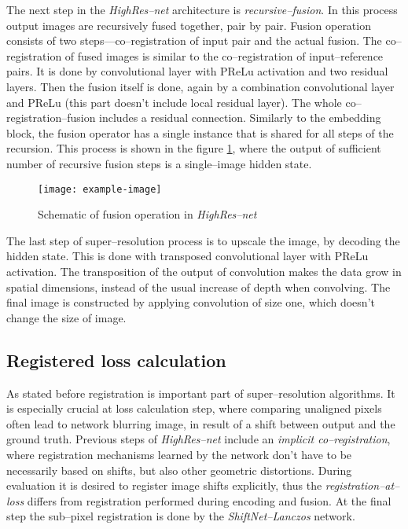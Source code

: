The next step in the \textit{HighRes--net} architecture is \textit{recursive--fusion}.
In this process output images are recursively fused together, pair by pair.
Fusion operation consists of two steps---co--registration of input pair and the actual fusion.
The co--registration of fused images is similar to the co--registration of input--reference pairs.
It is done by convolutional layer with PReLu activation and two residual layers.
Then the fusion itself is done, again by a combination convolutional layer and PReLu (this part doesn't include local residual layer).
The whole co--registration--fusion includes a residual connection.
Similarly to the embedding block, the fusion operator has a single instance that is shared for all steps of the recursion.
This process is shown in the figure \ref{fig:highresnet-fusion}, where the output of sufficient number of recursive fusion steps is a single--image hidden state.
\begin{figure}
    \centering
    \texttt{[image: example-image]}
    \caption{Schematic of fusion operation in \textit{HighRes--net}}
    \label{fig:highresnet-fusion}
\end{figure}

The last step of super--resolution process is to upscale the image, by decoding the hidden state.
This is done with transposed convolutional layer with PReLu activation.
The transposition of the output of convolution makes the data grow in spatial dimensions, instead of the usual increase of depth when convolving.
The final image is constructed by applying convolution of size one, which doesn't change the size of image.

\subsection{Registered loss calculation}
As stated before registration is important part of super--resolution algorithms.
It is especially crucial at loss calculation step, where comparing unaligned pixels often lead to network blurring image, in result of a shift between output and the ground truth.
Previous steps of \textit{HighRes--net} include an \textit{implicit co--registration}, where registration mechanisms learned by the network don't have to be necessarily based on shifts, but also other geometric distortions.
During evaluation it is desired to register image shifts explicitly, thus the \textit{registration--at--loss} differs from registration performed during encoding and fusion.
At the final step the sub--pixel registration is done by the \textit{ShiftNet--Lanczos} network.
 